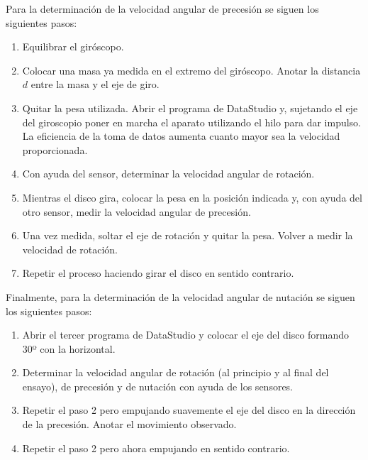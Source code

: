 \documentclass[a4paper]{article}
\begin{document}
Para la determinación de la velocidad angular de precesión se siguen los siguientes pasos:
\begin{enumerate}
\item Equilibrar el giróscopo.
\item Colocar una masa ya medida en el extremo del giróscopo. Anotar la distancia $d$ entre la masa y el eje de giro.
\item Quitar la pesa utilizada. Abrir el programa de DataStudio y, sujetando el eje del giroscopio poner en marcha el aparato utilizando el hilo para dar impulso. La eficiencia de la toma de datos aumenta cuanto mayor sea la velocidad proporcionada.
\item Con ayuda del sensor, determinar la velocidad angular de rotación.
\item Mientras el disco gira, colocar la pesa en la posición indicada y, con ayuda del otro sensor, medir la velocidad angular de precesión.
\item Una vez medida, soltar el eje de rotación y quitar la pesa. Volver a medir la velocidad de rotación. 
\item Repetir el proceso haciendo girar el disco en sentido contrario.
\end{enumerate}
Finalmente, para la determinación de la velocidad angular de nutación se siguen los siguientes pasos:
\begin{enumerate}
\item Abrir el tercer programa de DataStudio y colocar el eje del disco formando 30º con la horizontal.
\item Determinar la velocidad angular de rotación (al principio y al final del ensayo), de precesión y de nutación con ayuda de los sensores.
\item Repetir el paso 2 pero empujando suavemente el eje del disco en la dirección de la precesión. Anotar el movimiento observado.
\item Repetir el paso 2 pero ahora empujando en sentido contrario.
\end{enumerate}
\end{document}
